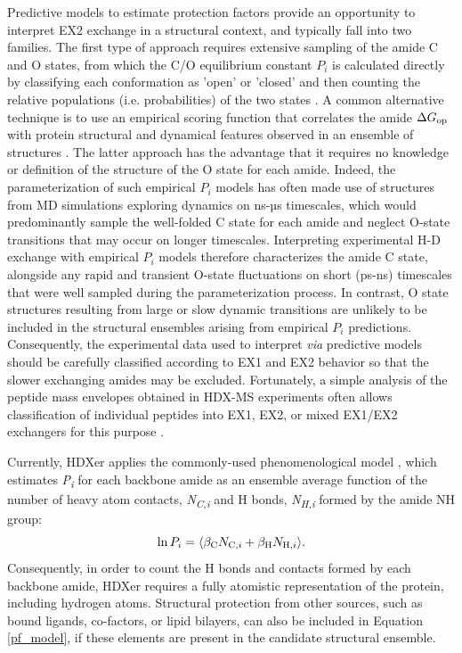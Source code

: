 \documentclass[9pt,tutorial,ASAPversion]{livecoms}
\begin{document}
Predictive models to estimate protection factors provide an opportunity to interpret EX2 exchange in a structural context, and typically fall into two families. 
The first type of approach requires extensive sampling of the amide C and O states, from which the C/O equilibrium constant $P_i$ is calculated directly by classifying each conformation as 'open' or 'closed' and then counting the relative populations (i.e. probabilities) of the two states \cite{Persson2015, Liu2012}.
A common alternative technique is to use an empirical scoring function that correlates the amide $\Delta G_\textnormal{op}$ with protein structural and dynamical features observed in an ensemble of structures  \cite{VendruscoloPaci2003, BestVendruscolo2006, Kieseritzky2006, Ma2011, Petruk2013, Park2015, Markwick2019}.
The latter approach has the advantage that it requires no knowledge or definition of the structure of the O state for each amide. 
Indeed, the parameterization of such empirical $P_i$ models has often made use of structures from MD simulations exploring dynamics on ns-µs timescales, which would predominantly sample the well-folded C state for each amide and neglect O-state transitions that may occur on longer timescales.
Interpreting experimental H-D exchange with empirical $P_i$ models therefore characterizes the amide C state, alongside any rapid and transient O-state fluctuations on short (ps-ns) timescales that were well sampled during the parameterization process.
In contrast, O state structures resulting from large or slow dynamic transitions are unlikely to be included in the structural ensembles arising from empirical $P_i$ predictions. 
Consequently, the experimental data used to interpret \textit{via} predictive models should be carefully classified according to EX1 and EX2 behavior so that the slower exchanging amides may be excluded.
Fortunately, a simple analysis of the peptide mass envelopes obtained in HDX-MS experiments often allows classification of individual peptides into EX1, EX2, or mixed EX1/EX2 exchangers for this purpose \cite{Jensen2016, Ferraro2004, James2021}.

Currently, HDXer applies the commonly-used phenomenological model \cite{VendruscoloPaci2003, BestVendruscolo2006}, which estimates \textit{P\textsubscript{i}} for each backbone amide as an ensemble average function of the number of heavy atom contacts, \textit{N\textsubscript{C,i}} and H bonds, \textit{N\textsubscript{H,i}} formed by the amide NH group: 
\begin{equation}\label{pf_model}
    \ln{P_i} = \langle \beta_\textnormal{C} N_{\textnormal{C},i} + \beta_\textnormal{H} N_{\textnormal{H},i} \rangle.
\end{equation} 
Consequently, in order to count the H bonds and contacts formed by each backbone amide, HDXer requires a fully atomistic representation of the protein, including hydrogen atoms.
Structural protection from other sources, such as bound ligands, co-factors, or lipid bilayers, can also be included in Equation \ref{pf_model}, if these elements are present in the candidate structural ensemble. 
\end{document}
